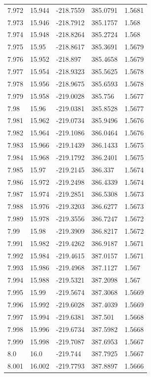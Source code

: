 \begin{tabular}{lllll}
7.972 & 15.944 & -218.7559 & 385.0791 & 1.5681 \\
7.973 & 15.946 & -218.7912 & 385.1757 & 1.568 \\
7.974 & 15.948 & -218.8264 & 385.2724 & 1.568 \\
7.975 & 15.95 & -218.8617 & 385.3691 & 1.5679 \\
7.976 & 15.952 & -218.897 & 385.4658 & 1.5679 \\
7.977 & 15.954 & -218.9323 & 385.5625 & 1.5678 \\
7.978 & 15.956 & -218.9675 & 385.6593 & 1.5678 \\
7.979 & 15.958 & -219.0028 & 385.756 & 1.5677 \\
7.98 & 15.96 & -219.0381 & 385.8528 & 1.5677 \\
7.981 & 15.962 & -219.0734 & 385.9496 & 1.5676 \\
7.982 & 15.964 & -219.1086 & 386.0464 & 1.5676 \\
7.983 & 15.966 & -219.1439 & 386.1433 & 1.5675 \\
7.984 & 15.968 & -219.1792 & 386.2401 & 1.5675 \\
7.985 & 15.97 & -219.2145 & 386.337 & 1.5674 \\
7.986 & 15.972 & -219.2498 & 386.4339 & 1.5674 \\
7.987 & 15.974 & -219.2851 & 386.5308 & 1.5673 \\
7.988 & 15.976 & -219.3203 & 386.6277 & 1.5673 \\
7.989 & 15.978 & -219.3556 & 386.7247 & 1.5672 \\
7.99 & 15.98 & -219.3909 & 386.8217 & 1.5672 \\
7.991 & 15.982 & -219.4262 & 386.9187 & 1.5671 \\
7.992 & 15.984 & -219.4615 & 387.0157 & 1.5671 \\
7.993 & 15.986 & -219.4968 & 387.1127 & 1.567 \\
7.994 & 15.988 & -219.5321 & 387.2098 & 1.567 \\
7.995 & 15.99 & -219.5674 & 387.3068 & 1.5669 \\
7.996 & 15.992 & -219.6028 & 387.4039 & 1.5669 \\
7.997 & 15.994 & -219.6381 & 387.501 & 1.5668 \\
7.998 & 15.996 & -219.6734 & 387.5982 & 1.5668 \\
7.999 & 15.998 & -219.7087 & 387.6953 & 1.5667 \\
8.0 & 16.0 & -219.744 & 387.7925 & 1.5667 \\
8.001 & 16.002 & -219.7793 & 387.8897 & 1.5666 \\

\end{tabular}
